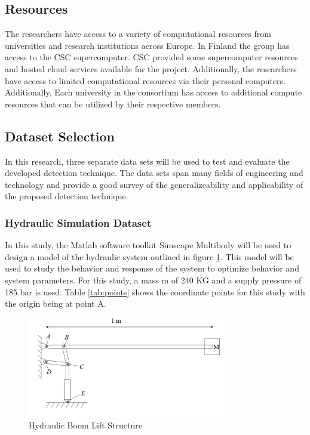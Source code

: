 \subsection{Resources}

The researchers have access to a variety of computational resources from universities and research institutions across Europe. In Finland the group has access to the CSC supercomputer. CSC provided some supercomputer resources and hosted cloud services available for the project. Additionally, the researchers have access to limited computational resources via their personal computers. Additionally, Each university in the consortium has access to additional compute resources that can be utilized by their respective members.

\subsection{Dataset Selection}
\label{ref_datasets}

In this research, three separate data sets will be used to test and evaluate the developed detection technique. The data sets span many fields of engineering and technology and provide a good survey of the generalizeability and applicability of the proposed detection technique.  

\subsubsection{Hydraulic Simulation Dataset}
\label{ref_hydraulic_dataset}

In this study, the Matlab software toolkit Simscape Multibody will be used to design a model of the hydraulic system outlined in figure \ref{fig:boom_structure}. This model will be used to study the behavior and response of the system to optimize behavior and system parameters. For this study, a mass m of 240 KG and a supply pressure of 185 bar is used. Table \ref{tab:points} shows the coordinate points for this study with the origin being at point A.

 \begin{figure}[H]
    \includegraphics[width=0.8\textwidth]{1_hydraulic_sim/BoomStructure.PNG}
    \caption{Hydraulic Boom Lift Structure}
    \label{fig:boom_structure}
 \end{figure}
 
